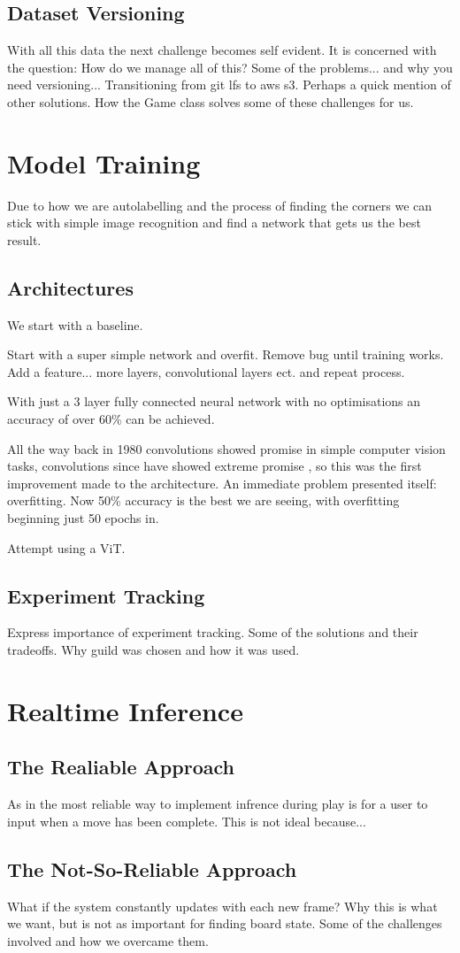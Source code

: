 \subsection{Dataset Versioning}
With all this data the next challenge becomes self evident.
It is concerned with the question: How do we manage all of this?
Some of the problems... and why you need versioning...
Transitioning from git lfs to aws s3.  Perhaps a quick mention of other solutions.
How the Game class solves some of these challenges for us.


\section{Model Training}
Due to how we are autolabelling and the process of finding the corners we can stick with simple
image recognition and find a network that gets us the best result.

\subsection{Architectures}
We start with a baseline.

Start with a super simple network and overfit.  Remove bug until training works.
Add a feature... more layers, convolutional layers ect. and repeat process.

With just a 3 layer fully connected neural network with no optimisations an accuracy of over 60\% can be achieved.

All the way back in 1980 \cite{} convolutions showed promise in simple computer vision tasks, 
convolutions since have showed extreme promise \cite{}, so this was the first improvement made 
to the architecture.  
An immediate problem presented itself: overfitting.  Now 50\% accuracy is the best we are seeing, with overfitting
beginning just 50 epochs in.

Attempt using a ViT.

\subsection{Experiment Tracking}
Express importance of experiment tracking.  Some of the solutions \cite{} and their tradeoffs.
Why guild was chosen and how it was used.


\section{Realtime Inference}

\subsection{The Realiable Approach}
As in \cite{} the most reliable way to implement infrence during play is for a user to input when a move
has been complete.
This is not ideal because...

\subsection{The Not-So-Reliable Approach}
What if the system constantly updates with each new frame?
Why this is what we want, but is not as important for finding board state.
Some of the challenges involved and how we overcame them.